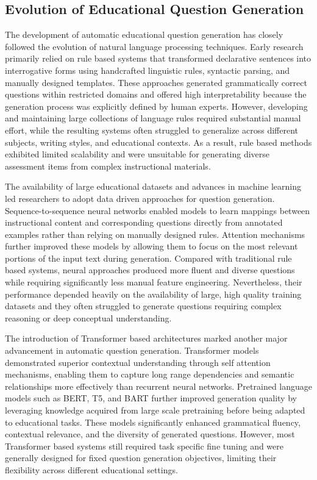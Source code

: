 \subsection{Evolution of Educational Question Generation}
\label{sec:lit-evolution}

The development of automatic educational question generation has closely followed the evolution of natural language processing techniques. Early research primarily relied on rule based systems that transformed declarative sentences into interrogative forms using handcrafted linguistic rules, syntactic parsing, and manually designed templates. These approaches generated grammatically correct questions within restricted domains and offered high interpretability because the generation process was explicitly defined by human experts. However, developing and maintaining large collections of language rules required substantial manual effort, while the resulting systems often struggled to generalize across different subjects, writing styles, and educational contexts. As a result, rule based methods exhibited limited scalability and were unsuitable for generating diverse assessment items from complex instructional materials.

The availability of large educational datasets and advances in machine learning led researchers to adopt data driven approaches for question generation. Sequence-to-sequence neural networks enabled models to learn mappings between instructional content and corresponding questions directly from annotated examples rather than relying on manually designed rules. Attention mechanisms further improved these models by allowing them to focus on the most relevant portions of the input text during generation. Compared with traditional rule based systems, neural approaches produced more fluent and diverse questions while requiring significantly less manual feature engineering. Nevertheless, their performance depended heavily on the availability of large, high quality training datasets and they often struggled to generate questions requiring complex reasoning or deep conceptual understanding.

The introduction of Transformer based architectures marked another major advancement in automatic question generation. Transformer models demonstrated superior contextual understanding through self attention mechanisms, enabling them to capture long range dependencies and semantic relationships more effectively than recurrent neural networks. Pretrained language models such as BERT, T5, and BART further improved generation quality by leveraging knowledge acquired from large scale pretraining before being adapted to educational tasks. These models significantly enhanced grammatical fluency, contextual relevance, and the diversity of generated questions. However, most Transformer based systems still required task specific fine tuning and were generally designed for fixed question generation objectives, limiting their flexibility across different educational settings.

